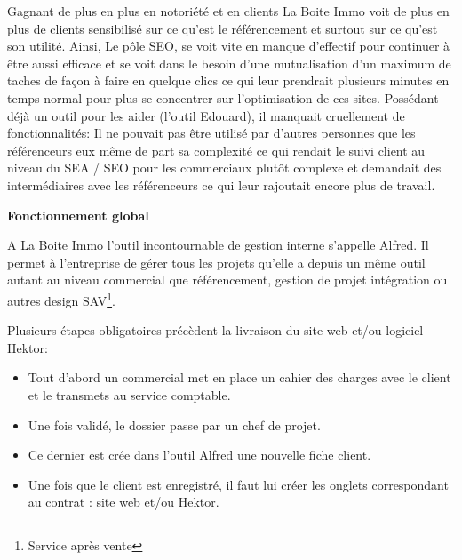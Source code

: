 \documentclass[12pt]{article}
\begin{document}
Gagnant de plus en plus en notoriété et en clients La Boite Immo voit de plus en plus de clients sensibilisé sur ce qu'est le référencement et surtout sur ce qu'est son utilité. Ainsi, Le pôle SEO, se voit vite en manque d'effectif pour continuer à être aussi efficace et se voit dans le besoin d'une mutualisation d'un maximum de taches de façon à faire en quelque clics ce qui leur prendrait plusieurs minutes en temps normal pour plus se concentrer sur l'optimisation de ces sites. 
Possédant déjà un outil pour les aider (l'outil Edouard), il manquait cruellement de fonctionnalités: Il ne pouvait pas être utilisé par d'autres personnes que les référenceurs eux même de part sa complexité ce qui rendait le suivi client au niveau du SEA / SEO pour les commerciaux plutôt complexe et demandait des intermédiaires avec les référenceurs ce qui leur rajoutait encore plus de travail.

\medbreak
\textbf{Fonctionnement global}

A La Boite Immo l'outil incontournable de gestion interne s'appelle Alfred. Il permet à l'entreprise de gérer tous les projets qu'elle a depuis un même outil autant au niveau commercial que référencement, gestion de projet intégration ou autres design SAV\footnote{Service après vente}.

Plusieurs étapes obligatoires précèdent la livraison du site web et/ou logiciel Hektor:

\begin{itemize}
\item Tout d'abord un commercial met en place un cahier des charges avec le client et le transmets au service comptable.
\end{itemize}
\begin{itemize}
\item Une fois validé, le dossier passe par un chef de projet.
\end{itemize}
\begin{itemize}
\item Ce dernier est crée dans l'outil Alfred une nouvelle fiche client.
\end{itemize}
\begin{itemize}
\item Une fois que le client est enregistré, il faut lui créer les onglets correspondant au contrat : site web et/ou Hektor.
\end{itemize}

\newpage
\end{document}

